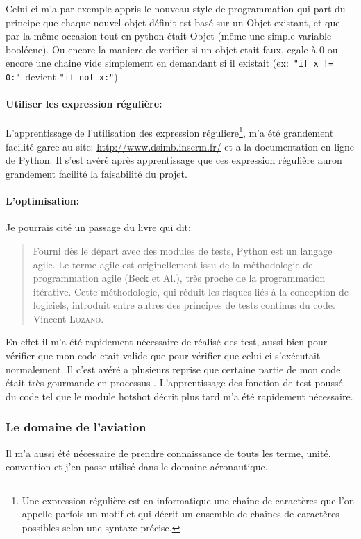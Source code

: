 Celui ci m'a par exemple appris le nouveau style de programmation qui part du principe que chaque nouvel objet définit est basé sur un Objet existant, et que par la même occasion tout en python était Objet (même une simple variable booléene). Ou encore la maniere de verifier si un objet etait faux, egale à 0 ou encore une chaine vide simplement en demandant si il existait (ex:~\texttt{"if x != 0:"}~devient \texttt{"if not x:"})

            \paragraph{Utiliser les expression régulière:} 
L'apprentissage de l'utilisation des expression réguliere\footnote{Une expression régulière
 est en informatique une chaîne de caractères que l’on appelle parfois un motif et qui décrit un ensemble de chaînes de caractères possibles selon une syntaxe précise.}, m'a été grandement facilité garce au site: \url{http://www.dsimb.inserm.fr/}\cite{re} et a la documentation en ligne de Python\cite{pydoc}. Il s'est avéré après apprentissage que ces expression régulière auron grandement facilité la faisabilité du projet.

            \paragraph{L'optimisation:} 
Je pourrais cité un passage du livre qui dit:
\begin{quotation}
Fourni dès le départ avec des modules de tests, Python est un langage agile. Le terme agile est originellement issu de la méthodologie de programmation agile (Beck et Al.), très proche de la programmation itérative. Cette méthodologie, qui réduit les risques liés à la conception de logiciels, introduit entre autres des principes de tests continus du code.
\raggedleft Vincent \textsc{Lozano}.
\end{quotation}

En effet il m'a été rapidement nécessaire de réalisé des test, aussi bien pour vérifier que mon code etait valide que pour vérifier que celui-ci s’exécutait normalement. Il c'est avéré a plusieurs reprise que certaine partie de mon code était très gourmande en processus %
. L’apprentissage des fonction de test poussé du code tel que le module hotshot décrit plus tard %
m'a été rapidement nécessaire.

        \subsubsection{Le domaine de l'aviation}
Il m'a aussi été nécessaire de prendre connaissance de touts les terme, unité, convention et j'en passe utilisé dans le domaine aéronautique.

